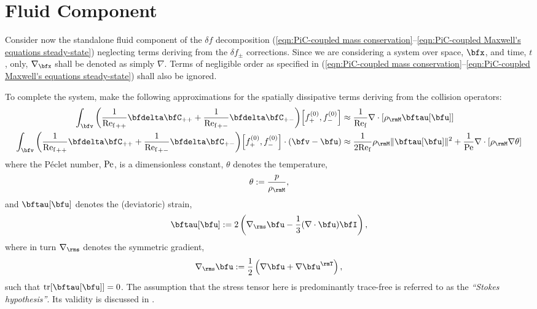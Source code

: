 \chapter{Fluid Component}\label{cha:fluid component}
    Consider now the standalone fluid component of the $\delta\!f$ decomposition (\ref{eqn:PiC-coupled mass conservation}--\ref{eqn:PiC-coupled Maxwell's equations steady-state}) neglecting terms deriving from the $\delta\!f_{\pm}$ corrections. Since we are considering a system over space, $\bfx$, and time, $t$, only, $\nabla_{\bfx}$ shall be denoted as simply $\nabla$. Terms of negligible order as specified in (\ref{eqn:PiC-coupled mass conservation}--\ref{eqn:PiC-coupled Maxwell's equations steady-state}) shall also be ignored.
    
    To complete the system, make the following approximations for the spatially dissipative terms deriving from the collision operators:
    \begin{align}
        \int_{\bfv}\left(\frac{1}{{\rmRef}_{++}}\bfdelta\bfC_{++} + \frac{1}{{\rmRef}_{+-}}\bfdelta\bfC_{+-}\right)\!\left[f_{+}^{(0)}, f_{-}^{(0)}\right]                    &\approx  \frac{1}{\rmRef}\nabla\cdot[\rho_{\rmM}\bftau[\bfu]]  \\
        \int_{\bfv}\left(\frac{1}{{\rmRef}_{++}}\bfdelta\bfC_{++} + \frac{1}{{\rmRef}_{+-}}\bfdelta\bfC_{+-}\right)\!\left[f_{+}^{(0)}, f_{-}^{(0)}\right]\cdot(\bfv - \bfu)  &\approx  \frac{1}{2\rmRef}\rho_{\rmM}\|\bftau[\bfu]\|^{2} + \frac{1}{\rmPe}\nabla\cdot[\rho_{\rmM}\nabla\theta]
    \end{align}
    where the Péclet number, $\mathrm{Pe}$, is a dimensionless constant, $\theta$ denotes the temperature,
    \begin{equation}
        \theta  :=  \frac{p}{\rho_{\rmM}},
    \end{equation}
    and $\bftau[\bfu]$ denotes the (deviatoric) strain,
    \begin{equation}\label{eqn:strain equation}
        \bftau[\bfu]  :=  2\left(\nabla_{\rms}\bfu - \frac{1}{3}(\nabla\cdot\bfu)\bfI\right),
    \end{equation}
    where in turn $\nabla_{\rms}$ denotes the symmetric gradient,
    \begin{equation}
        \nabla_{\rms}\bfu  :=  \frac{1}{2}\left(\nabla\bfu + \nabla\bfu^{\rmT}\right),
    \end{equation}
    such that $\tr[\bftau[\bfu]]  =  0$. The assumption that the stress tensor here is predominantly trace-free is referred to as the \emph{``Stokes hypothesis''}. \cite{Stokes_1845} Its validity is discussed in \cite{Vincenti_Kruger_1975}.

